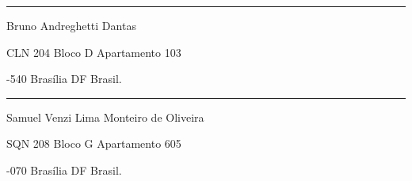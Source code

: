 \noindent \bigskip{}

\noindent
\begin{minipage}{.5\textwidth}
		\noindent \rule[0.5ex]{1\columnwidth}{1pt}

	\noindent Bruno Andreghetti Dantas

	\noindent CLN 204 Bloco D Apartamento 103

	-540 Brasília \textendash{} DF \textendash{} Brasil.

\end{minipage}%
\begin{minipage}{.5\textwidth}
		\noindent \rule[0.5ex]{1\columnwidth}{1pt}

	\noindent Samuel Venzi Lima Monteiro de Oliveira

	\noindent SQN 208 Bloco G Apartamento 605

	-070 Brasília \textendash{} DF \textendash{} Brasil.

\end{minipage}


